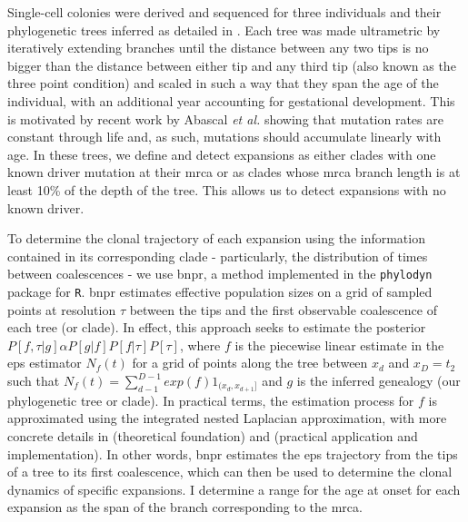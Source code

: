 Single-cell colonies were derived and sequenced for three individuals and their phylogenetic trees inferred as detailed in \cite{Fabre2021-uw}. Each tree was made ultrametric by iteratively extending branches until the distance between any two tips is no bigger than the distance between either tip and any third tip (also known as the three point condition) and scaled in such a way that they span the age of the individual, with an additional year accounting for gestational development. This is motivated by recent work by Abascal \textit{et al.} showing that mutation rates are constant through life \cite{Abascal_2021_gjvqfm} and, as such, mutations should accumulate linearly with age. In these trees, we define and detect expansions as either clades with one known driver mutation at their \ac{mrca} or as clades whose \ac{mrca} branch length is at least 10\% of the depth of the tree. This allows us to detect expansions with no known driver. 

To determine the clonal trajectory of each expansion using the information contained in its corresponding clade - particularly, the distribution of times between coalescences - we use \ac{bnpr}, a method implemented in the \texttt{phylodyn} \cite{Lan2015-sw,Karcher2017-kt} package for \texttt{R}. \ac{bnpr} estimates effective population sizes on a grid of sampled points at resolution $\tau$ between the tips and the first observable coalescence of each tree (or clade). In effect, this approach seeks to estimate the posterior $P[f,\tau|g]\alpha P[g|f]P[f|\tau]P[\tau]$, where $f$ is the piecewise linear estimate in the \ac{eps} estimator $N_f(t)$ for a grid of points along the tree between $x_d$ and $x_D=t_2$ such that $N_f(t) = \sum^{D-1}_{d-1}exp(f)1_{(x_d,x_{d+1}]}$ and $g$ is the inferred genealogy (our phylogenetic tree or clade). In practical terms, the estimation process for $f$ is approximated using the integrated nested Laplacian approximation, with more concrete details in \cite{Lan2015-sw} (theoretical foundation) and \cite{Karcher2017-kt} (practical application and implementation). In other words, \ac{bnpr} estimates the \ac{eps} trajectory from the tips of a tree to its first coalescence, which can then be used to determine the clonal dynamics of specific expansions. I determine a range for the age at onset for each expansion as the span of the branch corresponding to the \ac{mrca}. 